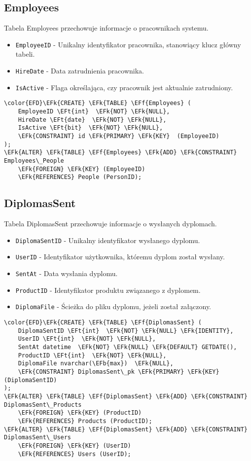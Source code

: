 \documentclass[11pt]{article}
\newcommand{\EFk}[1]{\textcolor{EFk}{\textbf{#1}}} %
\newcommand{\EFb}[1]{\textcolor{EFb}{\textbf{#1}}} %
\newcommand{\EFf}[1]{\textcolor{EFf}{#1}} %
\newcommand{\EFt}[1]{\textcolor{EFt}{\textbf{#1}}} %
\begin{document}
\subsection{Employees}
\label{sec:org80e05bf}
Tabela Employees przechowuje informacje o pracownikach systemu.
\begin{itemize}
\item \texttt{EmployeeID} - Unikalny identyfikator pracownika, stanowiący klucz główny tabeli.
\item \texttt{HireDate} - Data zatrudnienia pracownika.
\item \texttt{IsActive} - Flaga określająca, czy pracownik jest aktualnie zatrudniony.
\end{itemize}
\begin{Code}
\begin{Verbatim}
\color{EFD}\EFk{CREATE} \EFk{TABLE} \EFf{Employees} (
    EmployeeID \EFt{int}  \EFk{NOT} \EFk{NULL},
    HireDate \EFt{date}  \EFk{NOT} \EFk{NULL},
    IsActive \EFt{bit}  \EFk{NOT} \EFk{NULL},
    \EFk{CONSTRAINT} id \EFk{PRIMARY} \EFk{KEY}  (EmployeeID)
);
\EFk{ALTER} \EFk{TABLE} \EFf{Employees} \EFk{ADD} \EFk{CONSTRAINT} Employees\_People
    \EFk{FOREIGN} \EFk{KEY} (EmployeeID)
    \EFk{REFERENCES} People (PersonID);
\end{Verbatim}
\end{Code}
\subsection{DiplomasSent}
\label{sec:org56613dc}
Tabela DiplomasSent przechowuje informacje o wysłanych dyplomach.
\begin{itemize}
\item \texttt{DiplomaSentID} - Unikalny identyfikator wysłanego dyplomu.
\item \texttt{UserID} - Identyfikator użytkownika, któremu dyplom został wysłany.
\item \texttt{SentAt} - Data wysłania dyplomu.
\item \texttt{ProductID} - Identyfikator produktu związanego z dyplomem.
\item \texttt{DiplomaFile} - Ścieżka do pliku dyplomu, jeżeli został załączony.
\end{itemize}
\begin{Code}
\begin{Verbatim}
\color{EFD}\EFk{CREATE} \EFk{TABLE} \EFf{DiplomasSent} (
    DiplomaSentID \EFt{int}  \EFk{NOT} \EFk{NULL} \EFk{IDENTITY},
    UserID \EFt{int}  \EFk{NOT} \EFk{NULL},
    SentAt datetime  \EFk{NOT} \EFk{NULL} \EFk{DEFAULT} GETDATE(),
    ProductID \EFt{int}  \EFk{NOT} \EFk{NULL},
    DiplomaFile nvarchar(\EFb{max})  \EFk{NULL},
    \EFk{CONSTRAINT} DiplomasSent\_pk \EFk{PRIMARY} \EFk{KEY}  (DiplomaSentID)
);
\EFk{ALTER} \EFk{TABLE} \EFf{DiplomasSent} \EFk{ADD} \EFk{CONSTRAINT} DiplomasSent\_Products
    \EFk{FOREIGN} \EFk{KEY} (ProductID)
    \EFk{REFERENCES} Products (ProductID);
\EFk{ALTER} \EFk{TABLE} \EFf{DiplomasSent} \EFk{ADD} \EFk{CONSTRAINT} DiplomasSent\_Users
    \EFk{FOREIGN} \EFk{KEY} (UserID)
    \EFk{REFERENCES} Users (UserID);
\end{Verbatim}
\end{Code}
\end{document}
